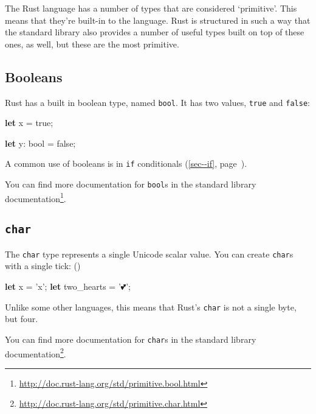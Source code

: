 \documentclass[a4paper,]{book}
\renewcommand*{\hyperref}[2][\ar]{%
  \def\ar{#2}%
  #2 (\autoref{#1}, page~\pageref{#1})}
\newenvironment{Shaded}{\begin{snugshade}}{\end{snugshade}}
\newcommand{\KeywordTok}[1]{\textcolor[rgb]{0.13,0.29,0.53}{\textbf{{#1}}}}
\newcommand{\DataTypeTok}[1]{\textcolor[rgb]{0.13,0.29,0.53}{{#1}}}
\newcommand{\ConstantTok}[1]{\textcolor[rgb]{0.00,0.00,0.00}{{#1}}}
\newcommand{\CharTok}[1]{\textcolor[rgb]{0.31,0.60,0.02}{{#1}}}
\newcommand{\NormalTok}[1]{{#1}}
\renewcommand{\href}[2]{#2\footnote{\url{#1}}}
\begin{document}
The Rust language has a number of types that are considered `primitive'.
This means that they're built-in to the language. Rust is structured in
such a way that the standard library also provides a number of useful
types built on top of these ones, as well, but these are the most
primitive.

\subsection{Booleans}\label{booleans}

Rust has a built in boolean type, named \texttt{bool}. It has two
values, \texttt{true} and \texttt{false}:

\begin{Shaded}
\begin{Highlighting}[]
\KeywordTok{let} \NormalTok{x = }\ConstantTok{true}\NormalTok{;}

\KeywordTok{let} \NormalTok{y: }\DataTypeTok{bool} \NormalTok{= }\ConstantTok{false}\NormalTok{;}
\end{Highlighting}
\end{Shaded}

A common use of booleans is in \hyperref[sec--if]{\texttt{if}
conditionals}.

You can find more documentation for \texttt{bool}s
\href{http://doc.rust-lang.org/std/primitive.bool.html}{in the standard
library documentation}.

\subsection{\texorpdfstring{\texttt{char}}{char}}\label{char}

The \texttt{char} type represents a single Unicode scalar value. You can
create \texttt{char}s with a single tick: (\texttt{\textquotesingle{}})

\begin{Shaded}
\begin{Highlighting}[]
\KeywordTok{let} \NormalTok{x = }\CharTok{'x'}\NormalTok{;}
\KeywordTok{let} \NormalTok{two_hearts = }\CharTok{'💕'}\NormalTok{;}
\end{Highlighting}
\end{Shaded}

Unlike some other languages, this means that Rust's \texttt{char} is not
a single byte, but four.

You can find more documentation for \texttt{char}s
\href{http://doc.rust-lang.org/std/primitive.char.html}{in the standard
library documentation}.
\end{document}
